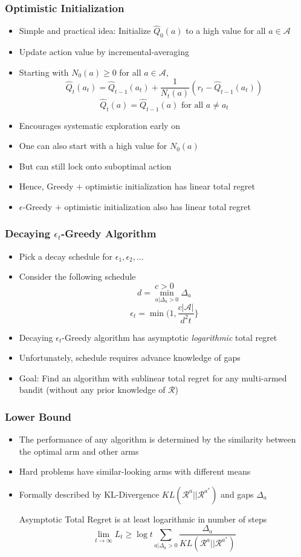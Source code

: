 \documentclass[handout]{beamer}
\begin{document}
\begin{frame}
\frametitle{Optimistic Initialization}
\pause
\begin{itemize}[<+->]
\item Simple and practical idea: Initialize $\hat{Q}_0(a)$ to a high value for all $a\in \mathcal{A}$
\item Update action value by incremental-averaging
\item Starting with $N_0(a) \geq 0$ for all $a\in \mathcal{A}$,
$$\hat{Q}_t(a_t) = \hat{Q}_{t-1}(a_t) + \frac 1 {N_t(a)} (r_t - \hat{Q}_{t-1}(a_t))$$
$$\hat{Q}_t(a) = \hat{Q}_{t-1}(a) \mbox{ for all } a \neq a_t$$
\item Encourages systematic exploration early on
\item One can also start with a high value for $N_0(a)$ 
\item But can still lock onto suboptimal action
\item Hence, Greedy $+$ optimistic initialization has linear total regret
\item $\epsilon$-Greedy $+$ optimistic initialization also has linear total regret
\end{itemize}
\end{frame}

\begin{frame}
\frametitle{Decaying $\epsilon_t$-Greedy Algorithm}
\pause
\begin{itemize}[<+->]
\item Pick a decay schedule for $\epsilon_1, \epsilon_2, \ldots$
\item Consider the following schedule
$$c > 0$$
$$d = \min_{a|\Delta_a > 0} \Delta_a$$
$$\epsilon_t = \min(1, \frac {c|\mathcal{A}|} {d^2t}\}$$
\item Decaying $\epsilon_t$-Greedy algorithm has asymptotic {\em logarithmic} total regret
\item Unfortunately, schedule requires advance knowledge of gaps
\item Goal: Find an algorithm with sublinear total regret for any multi-armed bandit (without any prior knowledge of $\mathcal{R}$)
\end{itemize}
\end{frame}



\begin{frame}
\frametitle{Lower Bound}
\pause
\begin{itemize}[<+->]
\item The performance of any algorithm is determined by the similarity between the optimal arm and other arms
\item Hard problems have similar-looking arms with different means
\item Formally described by KL-Divergence $KL(\mathcal{R}^a||\mathcal{R}^{a^*})$ and gaps $\Delta_a$
\begin{theorem}
Asymptotic Total Regret is at least logarithmic in number of steps
$$\lim_{t\rightarrow \infty} L_t \geq \log t \sum_{a|\Delta_a > 0} \frac {\Delta_a} {KL(\mathcal{R}^a||\mathcal{R}^{a^*})}$$
\end{theorem}
\end{itemize}
\end{frame}
\end{document}
